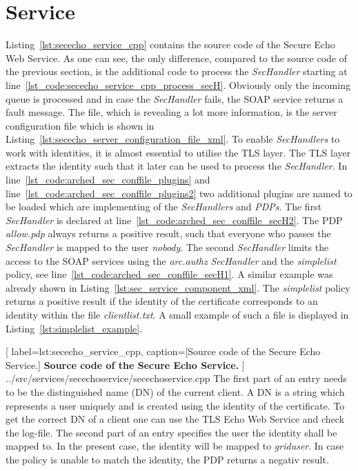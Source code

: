 \section{Service}

Listing~\ref{lst:sececho_service_cpp} contains the source code of the Secure Echo Web Service. As one can see, the only difference, compared to the source code of the previous section, is the additional code to process the \textit{SecHandler} starting at line~\ref{lst_code:sececho_service_cpp_process_secH}. Obviously only the incoming queue is processed and in case the \textit{SecHandler} fails, the SOAP service returns a fault message. The file, which is revealing a lot more information, is the server configuration file which is shown in Listing~\ref{lst:sececho_server_configuration_file_xml}. 
To enable \textit{SecHandlers} to work with identities, it is almost essential to utilise the TLS layer.
The TLS layer extracts the identity such that it later can be used to process the \textit{SecHandler}.
In line~\ref{lst_code:arched_sec_conffile_plugins} and line~\ref{lst_code:arched_sec_conffile_plugins2} two additional plugins 
are named to be loaded which are implementing of the \textit{SecHandlers} and \textit{PDPs}.
%
%
The first \textit{SecHandler} is declared at line~\ref{lst_code:arched_sec_conffile_secH2}. 
The PDP \textit{allow.pdp} always returns a positive result, such that everyone who passes the \textit{SecHandler} is mapped to the user \textit{nobody}. 
%
%
The second \textit{SecHandler} limits the access to the SOAP services using the \textit{arc.authz} \textit{SecHandler} and the \textit{simplelist} policy, see line~\ref{lst_code:arched_sec_conffile_secH1}. A similar example was already shown in Listing~\ref{lst:sec_service_component_xml}. The \textit{simplelist} policy returns a positive result if the identity of the certificate corresponds to an identity within the file \textit{clientlist.txt}. A small example of such a file is displayed in Listing~\ref{lst:simplelist_example}.

	[
	label=lst:sececho_service_cpp,
	caption={[Source code of the Secure Echo Service.]
	\textbf{Source code of the Secure Echo Service.}}
	]
{../src/services/secechoservice/secechoservice.cpp}
%
%
The first part of an entry needs to be the distinguished name (DN) of the current client. A DN is a string which represents a user uniquely and is created using the identity of the certificate. To get the correct DN of a client one can use the TLS Echo Web Service and check the log-file. The second part of an entry specifies the user the identity shall be mapped to. In the present case, the identity will be mapped to \textit{griduser}. In case the policy is unable to match the identity, the PDP returns a negativ result.
